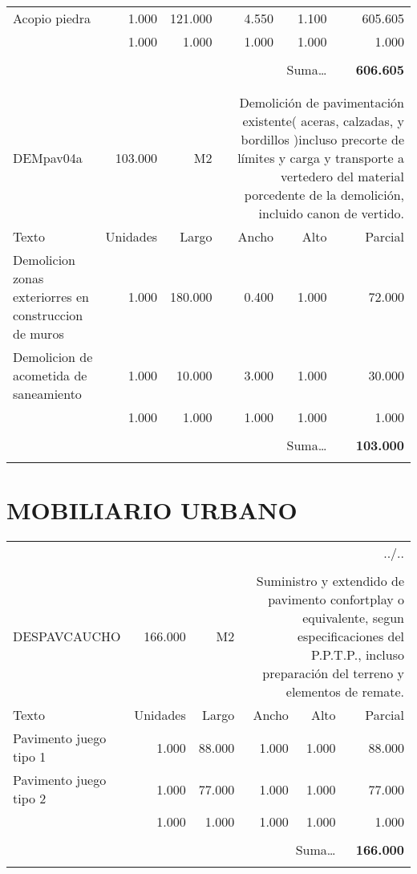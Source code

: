 \documentclass{book}%
\begin{document}
\begin{longtable}{lrrrrr}
\hline%
\multicolumn{1}{p{3.5cm}}{Acopio piedra}&1.000&121.000&4.550&1.100&605.605\\%
\multicolumn{1}{p{3.5cm}}{}&1.000&1.000&1.000&1.000&1.000\\%
&&&&&\\%
\multicolumn{5}{r}{Suma\ldots}&\textbf{606.605}\\%
\hline%
&&&&&\\%
&&&&&\\%
DEMpav04a&103.000& M2&\multicolumn{3}{p{6cm}}{\scriptsize Demolición de pavimentación existente( aceras, calzadas, y bordillos )incluso precorte de límites y carga y transporte a vertedero del material porcedente de la demolición, incluido canon de vertido.\normalsize}\\%
Texto&Unidades&Largo&Ancho&Alto&Parcial\\%
\hline%
\multicolumn{1}{p{3.5cm}}{Demolicion zonas exteriorres en construccion de muros }&1.000&180.000&0.400&1.000&72.000\\%
\multicolumn{1}{p{3.5cm}}{Demolicion de acometida de saneamiento}&1.000&10.000&3.000&1.000&30.000\\%
\multicolumn{1}{p{3.5cm}}{}&1.000&1.000&1.000&1.000&1.000\\%
&&&&&\\%
\multicolumn{5}{r}{Suma\ldots}&\textbf{103.000}\\%
\hline%
&&&&&\\%
\end{longtable}%
\newpage

%
\section{MOBILIARIO URBANO}%
\label{sec:MOBILIARIOURBANO}%
\begin{longtable}{lrrrrr}%
\multicolumn{6}{r}{../..}\\%
\endfoot%
\endlastfoot%
&&&&&\\%
DESPAVCAUCHO&166.000& M2&\multicolumn{3}{p{6cm}}{\scriptsize Suministro y extendido de pavimento confortplay o equivalente, segun especificaciones del P.P.T.P., incluso preparación del terreno y elementos de remate.\normalsize}\\%
Texto&Unidades&Largo&Ancho&Alto&Parcial\\%
\hline%
\multicolumn{1}{p{3.5cm}}{Pavimento juego tipo 1}&1.000&88.000&1.000&1.000&88.000\\%
\multicolumn{1}{p{3.5cm}}{Pavimento juego tipo 2	}&1.000&77.000&1.000&1.000&77.000\\%
\multicolumn{1}{p{3.5cm}}{}&1.000&1.000&1.000&1.000&1.000\\%
&&&&&\\%
\multicolumn{5}{r}{Suma\ldots}&\textbf{166.000}\\%
\hline%
&&&&&\\%
\end{longtable}%
\newpage
\end{document}
